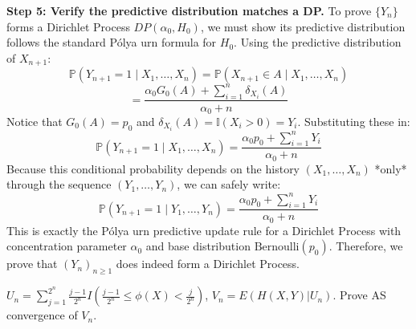 \begin{solution}
\textbf{Step 5: Verify the predictive distribution matches a DP.}
To prove $\{Y_n\}$ forms a Dirichlet Process $DP(\alpha_0, H_0)$, we must show its predictive distribution follows the standard Pólya urn formula for $H_0$.
Using the predictive distribution of $X_{n+1}$:
\[ \mathbb{P}(Y_{n+1} = 1 \mid X_1, \dots, X_n) = \mathbb{P}(X_{n+1} \in A \mid X_1, \dots, X_n) \]
\[ = \frac{\alpha_0 G_0(A) + \sum_{i=1}^n \delta_{X_i}(A)}{\alpha_0 + n} \]
Notice that $G_0(A) = p_0$ and $\delta_{X_i}(A) = \mathbb{I}(X_i > 0) = Y_i$. Substituting these in:
\[ \mathbb{P}(Y_{n+1} = 1 \mid X_1, \dots, X_n) = \frac{\alpha_0 p_0 + \sum_{i=1}^n Y_i}{\alpha_0 + n} \]
Because this conditional probability depends on the history $(X_1, \dots, X_n)$ *only* through the sequence $(Y_1, \dots, Y_n)$, we can safely write:
\[ \mathbb{P}(Y_{n+1} = 1 \mid Y_1, \dots, Y_n) = \frac{\alpha_0 p_0 + \sum_{i=1}^n Y_i}{\alpha_0 + n} \]
This is exactly the Pólya urn predictive update rule for a Dirichlet Process with concentration parameter $\alpha_0$ and base distribution $\text{Bernoulli}(p_0)$.
Therefore, we prove that $(Y_n)_{n \geq 1}$ does indeed form a Dirichlet Process.
\end{solution}

\begin{exercise}\label{probability:2024:2}
$U_n = \sum_{j=1}^{2^n} \frac{j-1}{2^n} I\left(\frac{j-1}{2^n} \leq \phi(X) < \frac{j}{2^n}\right)$, $V_n = E(H(X,Y) | U_n)$.
Prove AS convergence of $V_n$.
\end{exercise}

